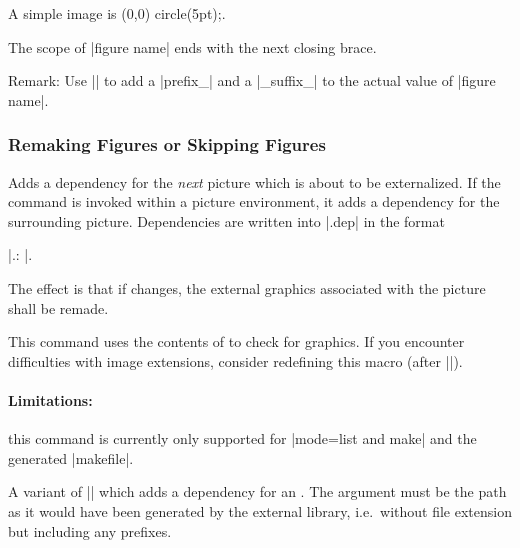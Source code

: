 {\begin{command}{}
\begin{codeexample}
{
  A simple image is \tikz \fill (0,0) circle(5pt);. %

}%


\end{codeexample}
	The scope of |figure name| ends with the next closing brace.

	Remark: Use || to add a |prefix_| and a |_suffix_| to the actual value of |figure name|.
\end{command}


\subsubsection{Remaking Figures or Skipping Figures}
\begin{command}{\tikzpicturedependsonfile{}}
	Adds a dependency for the \emph{next} picture which is about to be externalized. If the command is invoked within a picture environment, it adds a dependency for the surrounding picture. Dependencies are written into |.dep| in the format 
	
	|.\tikzexternalimgextension: |.

	The effect is that if  changes, the external graphics associated with the picture shall be remade.

	This command uses the contents of \declareandlabel{\tikzexternalimgextension} to check for graphics. If you encounter difficulties with image extensions, consider redefining this macro (after |\tikzexternalize|).

	\paragraph{Limitations:} this command is currently only supported for |mode=list and make| and the generated |makefile|.
\end{command}
\begin{command}{\tikzexternalfiledependsonfile{}}
	A variant of |\tikzpicturedependsonfile| which adds a dependency for an . The argument  must be the path as it would have been generated by the external library, i.e.\ without file extension but including any prefixes.
\end{command}

}
